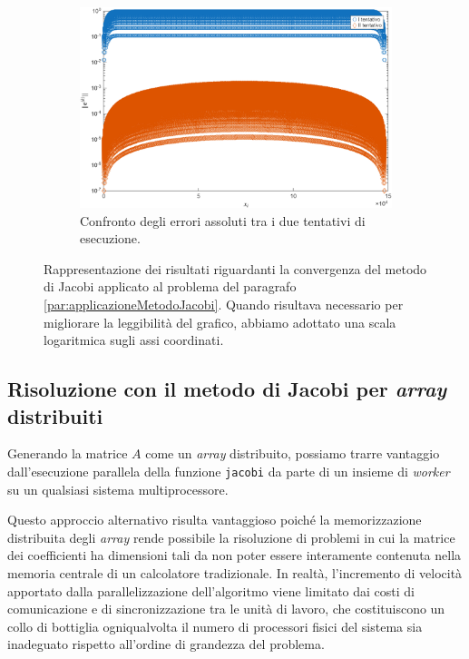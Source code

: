 \begin{figure}[!htbp]
    \vspace{1.5em}

     \begin{subfigure}{0.58\textwidth}
        \centering
        \includegraphics[width=\linewidth]{../Risorse/Capitolo 3/confrontoErroriAssoluti.png}
        \caption{Confronto degli errori assoluti tra i due tentativi di esecuzione.}
        \label{fig:confrontoErroriAssoluti}
    \end{subfigure}
    \caption{Rappresentazione dei risultati riguardanti la convergenza del metodo di Jacobi applicato al problema del paragrafo \ref{par:applicazioneMetodoJacobi}. Quando risultava necessario per migliorare la leggibilit\`a del grafico, abbiamo adottato una scala logaritmica sugli assi coordinati.}
    \label{fig:gruppoImmaginiAnalisiPrestazionale}
\end{figure}
\subsection{Risoluzione con il metodo di Jacobi per \textit{array} distribuiti}
Generando la matrice $A$ come un \textit{array} distribuito, possiamo trarre vantaggio dall'esecuzione parallela della funzione \lstinline{jacobi} da parte 
di un insieme di \textit{worker} su un qualsiasi sistema multiprocessore.

Questo approccio alternativo risulta vantaggioso poich\'e la memorizzazione distribuita degli \textit{array} rende possibile la risoluzione di problemi in cui la matrice dei coefficienti ha dimensioni 
tali da non poter essere interamente contenuta nella memoria centrale di un calcolatore tradizionale.\newline
In realt\`a, l'incremento di velocit\`a apportato dalla parallelizzazione dell'algoritmo viene limitato dai costi di comunicazione e di sincronizzazione tra le unit\`a di lavoro, che costituiscono un collo di bottiglia ogniqualvolta il numero di processori fisici del sistema sia inadeguato rispetto all'ordine di grandezza del problema.

